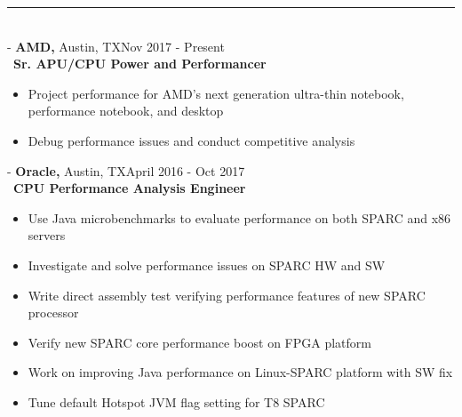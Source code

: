 \documentclass[12pt]{res}
\begin{document}
\begin{resume}
\vspace{-10pt}
\rule{18cm}{0.5mm}\\
 -\sectionwidth \resumewidth
{\textbf{AMD,}  Austin, TX\hfill Nov 2017 - Present} \hspace{-0.58in}\vspace{-0mm}\\\
  \textbf{Sr. APU/CPU Power and Performancer} \\
 \vspace{-14pt}
 \begin{itemize}[leftmargin=-0.1in]
   \item Project performance for AMD's next generation ultra-thin notebook, performance notebook, and desktop\vspace{-4pt}
   \item Debug performance issues and conduct competitive analysis  \vspace{-4pt}
  \end{itemize}
\vspace{-10pt}

 -\sectionwidth \resumewidth
{\textbf{Oracle,}  Austin, TX\hfill April 2016 - Oct 2017} \hspace{-0.58in}\vspace{-0mm}\\\
  \textbf{CPU Performance Analysis Engineer} \\
 \vspace{-14pt}
 \begin{itemize}[leftmargin=-0.1in]
   \item Use Java microbenchmarks to evaluate performance on both SPARC and x86 servers\vspace{-4pt}
   \item Investigate and solve performance issues on SPARC HW and SW  \vspace{-4pt}
   \item Write direct assembly test verifying performance features of new SPARC processor \vspace{-4pt}
   \item Verify new SPARC core performance boost on FPGA platform \vspace{-4pt}
   \item Work on improving Java performance on Linux-SPARC platform with SW fix\vspace{-4pt}
   \item Tune default Hotspot JVM flag setting for T8 SPARC \vspace{-4pt}
 \end{itemize}


\end{resume}
\end{document}
